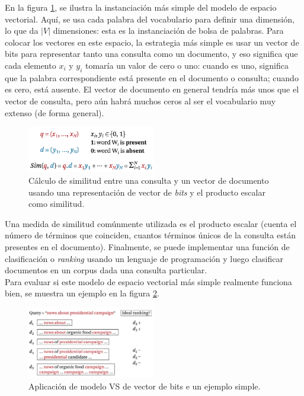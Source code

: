 En la figura \ref{fig:6.3}, se ilustra la instanciación más simple del modelo de espacio vectorial. Aquí, se usa cada palabra del vocabulario para definir una dimensión, lo que da $|V|$ dimensiones: esta es la instanciación de bolsa de palabras. Para colocar los vectores en este espacio, la estrategia más simple es usar un vector de bits para representar tanto una consulta como un documento, y eso significa que cada elemento $x_i$ y $y_i$ tomaría un valor de cero o uno: cuando es uno, significa que la palabra correspondiente está presente en el documento o consulta; cuando es cero, está ausente. El vector de documento en general tendría más unos que el vector de consulta, pero aún habrá muchos ceros al ser el vocabulario muy extenso (de forma general). \\

\begin{figure}[h]
\centering
\includegraphics[width=0.5\textwidth]{fotos/18.png}
\caption{Cálculo de similitud entre una consulta y un vector de documento usando una representación de vector de \textit{bits} y el producto escalar como similitud.}
\label{fig:6.3}
\end{figure}

Una medida de similitud comúnmente utilizada es el producto escalar (cuenta el número de términos que coinciden, cuantos términos únicos de la consulta están presentes en el documento). Finalmente, se puede implementar una función de clasificación o \textit{ranking} usando un lenguaje de programación y luego clasificar documentos en un corpus dada una consulta particular. \\

Para evaluar si este modelo de espacio vectorial más simple realmente funciona bien, se muestra un ejemplo en la figura \ref{fig:6.4}. \\

\begin{figure}[h]
\centering
\includegraphics[width=0.5\textwidth]{fotos/19.png}
\caption{Aplicación de modelo VS de vector de bits e un ejemplo simple.}
\label{fig:6.4}
\end{figure}

